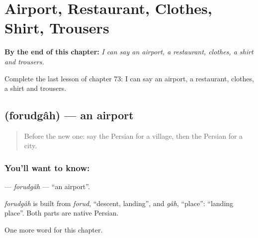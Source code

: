 
\chapter{Airport, Restaurant, Clothes, Shirt, Trousers}
\label{ch:fa-airport-restaurant-clothes-shirt-trousers}

\begin{chapteropening}
\textbf{By the end of this chapter:} \emph{I can say an airport, a restaurant, clothes, a shirt and trousers.}

Complete the last lesson of chapter 73: I can say an airport, a restaurant, clothes, a shirt and trousers.
\end{chapteropening}

\section[\texorpdfstring{\fa{فرودگاه} (forudgâh)}{فرودگاه (forudgâh)}]{ (forudgâh) — an airport}

\label{lesson:FA-C73-forudgah}



\begin{quote}
Before the new one: say the Persian for a village, then the Persian for a city.
\end{quote}

\subsection*{You'll want to know: }
\textbf{} — \emph{forudgâh} — \textquotedblleft{}an airport\textquotedblright{}.

\begin{cousinweb}
\emph{forudgâh} is built from \emph{forud}, \textquotedblleft{}descent, landing\textquotedblright{}, and \emph{gâh}, \textquotedblleft{}place\textquotedblright{}: \textquotedblleft{}landing place\textquotedblright{}. Both parts are native Persian.
\end{cousinweb}

\begin{grammarlens}[title={What you've built}]
One more word for this chapter.
\end{grammarlens}

